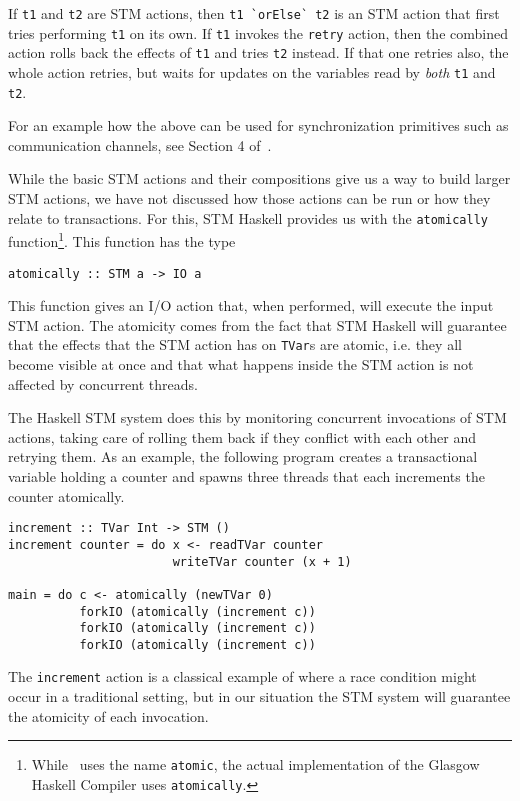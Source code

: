 If \lstinline+t1+ and \lstinline+t2+ are STM actions, then \lstinline+t1 `orElse` t2+
is an STM action that first tries performing \lstinline+t1+ on its own. 
If \lstinline+t1+ invokes the \lstinline+retry+ action,
then the combined action rolls back the effects of \lstinline+t1+ 
and tries \lstinline+t2+ instead. If that one retries also, the whole
action retries, but waits for updates on the variables read by {\em both} \lstinline+t1+ and \lstinline+t2+.

For an example how the above can be used for synchronization primitives such as communication channels, see Section
4 of~\cite{haskellstm}.

While the basic STM actions and their compositions give us a way to build larger STM actions, we have not
discussed how those actions can be run or how they relate to transactions. For this, STM Haskell provides us
with the \lstinline+atomically+ function\footnote{While~\cite{haskellstm} uses the name \lstinline+atomic+, the actual implementation
of the Glasgow Haskell Compiler uses \lstinline+atomically+.}. This function has the type
\begin{lstlisting}[style=small]
atomically :: STM a -> IO a
\end{lstlisting}
This function gives an I/O action that, when performed, will execute the input STM action.
The atomicity comes from the fact that STM Haskell will guarantee that the effects that the STM action has on
\lstinline+TVar+s are atomic, i.e. they all become visible at once and that what happens
inside the STM action is not affected by concurrent threads.  

The Haskell STM system does this by monitoring concurrent invocations of STM actions, taking care of rolling
them back if they conflict with each other and retrying them.
As an example, the following program creates
a transactional variable holding a counter and spawns three threads that each increments the counter atomically.
\begin{lstlisting}[style=small]
increment :: TVar Int -> STM ()
increment counter = do x <- readTVar counter
                       writeTVar counter (x + 1)

main = do c <- atomically (newTVar 0)
          forkIO (atomically (increment c))
          forkIO (atomically (increment c))
          forkIO (atomically (increment c))
\end{lstlisting}
The \lstinline+increment+ action is a classical example of where a race condition might occur 
in a traditional setting,
but in our situation the STM system will guarantee the atomicity of each invocation.


